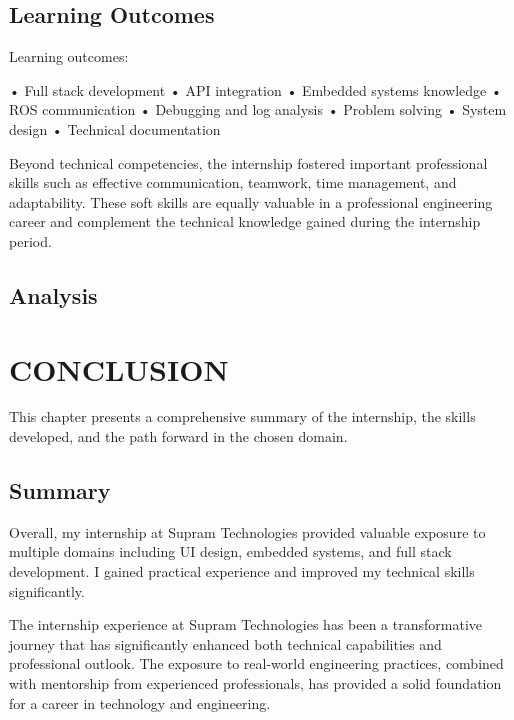 \documentclass[12pt,a4paper]{report}
\begin{document}
\section{Learning Outcomes}

Learning outcomes:


• Full stack development • API integration • Embedded systems knowledge • ROS communication • Debugging and log analysis • Problem solving • System design • Technical documentation


Beyond technical competencies, the internship fostered important professional skills such as effective communication, teamwork, time management, and adaptability. These soft skills are equally valuable in a professional engineering career and complement the technical knowledge gained during the internship period.


\section{Analysis}




\chapter{CONCLUSION}
\label{ch:conclusion}


This chapter presents a comprehensive summary of the internship, the skills developed, and the path forward in the chosen domain.




\section{Summary}

Overall, my internship at Supram Technologies provided valuable exposure to multiple domains including UI design, embedded systems, and full stack development. I gained practical experience and improved my technical skills significantly.


The internship experience at Supram Technologies has been a transformative journey that has significantly enhanced both technical capabilities and professional outlook. The exposure to real-world engineering practices, combined with mentorship from experienced professionals, has provided a solid foundation for a career in technology and engineering.
\end{document}
